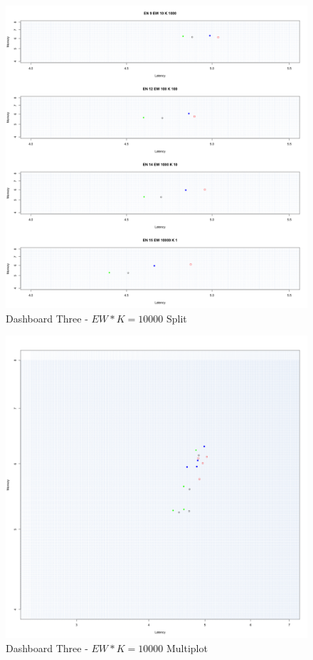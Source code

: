 \begin{figure}[tbh]
	\centering
	\includegraphics[width=0.90\linewidth]{images/dashboard-3-split}	
	\caption{Dashboard Three - $EW*K=10000$ Split} 
	\label{fig:result_dashboard_proba}
\end{figure}
\begin{figure}[tbh]
	\centering
	\includegraphics[width=0.90\linewidth]{images/dashboard-3}	
	\caption{Dashboard Three - $EW*K=10000$ Multiplot} 
	\label{fig:result_dashboard_probb}
\end{figure}

